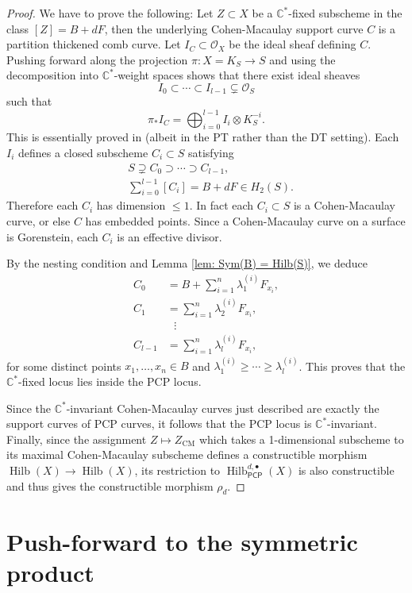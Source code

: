 \documentclass[12pt]{amsart}
\theoremstyle{definition}
\newcommand{\CC} {\mathbb{C}}          %
\renewcommand{\O}{\mathcal{O}}
\newcommand{\Hilb}{\operatorname{Hilb}}
\newcommand{\CM}{\operatorname{CM}}
\newcommand{\PCP}{\mathsf{PCP}}
\newcommand{\presectionspace}{\vspace{0.2cm}} %
\begin{document}
\begin{proof}
We have to prove the following: Let $Z \subset X$ be a $\CC^*$-fixed 
subscheme in the class $[Z]=B+dF$, then the underlying Cohen-Macaulay 
support curve $C$ is a partition thickened comb curve. Let 
$I_C \subset \O_X$ be the ideal sheaf defining $C$. Pushing forward 
along the projection $\pi : X=K_S \rightarrow S$ and using the 
decomposition into $\CC^*$-weight spaces shows that there exist 
ideal sheaves 
\[
I_0 \subset \cdots \subset I_{l-1} \subsetneq \O_S
\]
such that
\[
\pi_* I_C = \bigoplus_{i=0}^{l-1} I_i \otimes K_{S}^{-i}.
\]
This is essentially proved in \cite[Sect.~4]{Kool-Thomas2016} (albeit
in the PT rather than the DT setting). Each $I_i$ defines a closed
subscheme $C_i \subset S$ satisfying
\begin{align*}
&S \supsetneq C_0 \supset \cdots \supset C_{l-1}, \\
&\sum_{i=0}^{l-1} [C_i] = B + dF \in H_2(S).
\end{align*}
Therefore each $C_i$ has dimension $\leq 1$. In fact each $C_i \subset S$ 
is a Cohen-Macaulay curve, or else $C$ has embedded points. Since a 
Cohen-Macaulay curve on a surface is Gorenstein, each $C_i$ is an 
effective divisor.

By the nesting condition and Lemma \ref{lem: Sym(B) = Hilb(S)}, we 
deduce
\begin{align*}
C_0 &= B + \sum_{i=1}^{n} \lambda_{1}^{(i)} F_{x_i}, \\
C_1 &=  \sum_{i=1}^{n} \lambda_{2}^{(i)} F_{x_i}, \\
&\,\, \, \,\vdots \\
C_{l-1} &= \sum_{i=1}^{n} \lambda_{l}^{(i)} F_{x_i},
\end{align*}
for some distinct points $x_1, \ldots, x_n \in B$ and 
$\lambda_{1}^{(i)} \geq \cdots \geq \lambda_{l}^{(i)}$. 
This proves that the $\CC^*$-fixed locus lies inside the PCP locus.

Since the $\CC^*$-invariant Cohen-Macaulay curves just described are
exactly the support curves of PCP curves, it follows that the PCP
locus is $\CC^*$-invariant. Finally, since the assignment $Z\mapsto
Z_{\CM}$ which takes a 1-dimensional subscheme to its maximal
Cohen-Macaulay subscheme defines a constructible morphism $\Hilb (X)
\to \Hilb (X)$, its restriction to $\Hilb^{d,\bullet }_{\PCP}(X)$ is
also constructible and thus gives the constructible morphism
$\rho_{d}$.
\end{proof}


\presectionspace
\section{Push-forward to the symmetric product} \label{sec: pushforward to sym prod}
\end{document}

